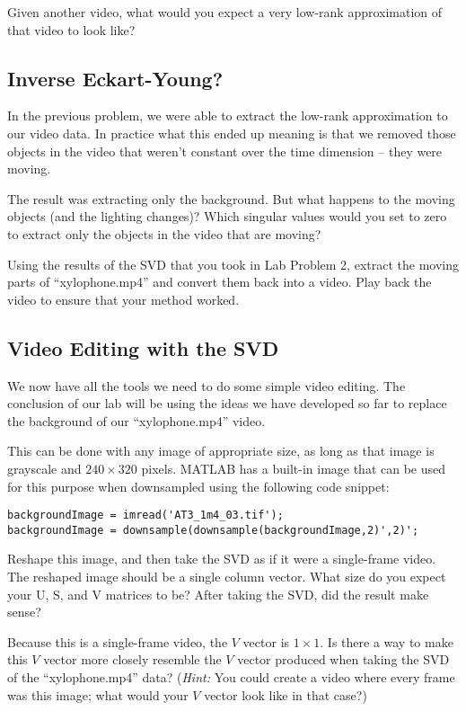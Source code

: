 Given another video, what would you expect a very low-rank approximation of that video to look like?

\subsection{Inverse Eckart-Young?}

In the previous problem, we were able to extract the low-rank approximation to our video data. In practice what this ended up meaning is that we removed those objects in the video that weren't constant over the time dimension -- they were moving.

The result was extracting only the background. But what happens to the moving objects (and the lighting changes)? Which singular values would you set to zero to extract only the objects in the video that are moving?

Using the results of the SVD that you took in Lab Problem 2, extract the moving parts of ``xylophone.mp4'' and convert them back into a video. Play back the video to ensure that your method worked.

\subsection{Video Editing with the SVD}

We now have all the tools we need to do some simple video editing. The conclusion of our lab will be using the ideas we have developed so far to replace the background of our ``xylophone.mp4'' video.

This can be done with any image of appropriate size, as long as that image is grayscale and $240 \times 320$ pixels. MATLAB has a built-in image that can be used for this purpose when downsampled using the following code snippet:

\begin{lstlisting}[style=code]
backgroundImage = imread('AT3_1m4_03.tif');
backgroundImage = downsample(downsample(backgroundImage,2)',2)';
\end{lstlisting}

Reshape this image, and then take the SVD as if it were a single-frame video. The reshaped image should be a single column vector. What size do you expect your U, S, and V matrices to be? After taking the SVD, did the result make sense?

Because this is a single-frame video, the $V$ vector is $1\times 1$. Is there a way to make this $V$ vector more closely resemble the $V$ vector produced when taking the SVD of the ``xylophone.mp4'' data?
(\textit{Hint:}  You could create a video where every frame was this image; what would your $V$ vector look like in that case?)

